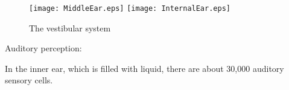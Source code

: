 \documentclass[../main.tex]{subfiles}
\begin{document}
        \begin{figure}[htb]
          \centering
          \texttt{[image: MiddleEar.eps]}
          \texttt{[image: InternalEar.eps]}
          \caption[The vestibular system]{The vestibular system~\cite{BlausenLimbic}}
        \end{figure}

        Auditory perception:

        In the inner ear, which is filled with liquid, there are about 30,000 auditory sensory cells.
        
\end{document}
